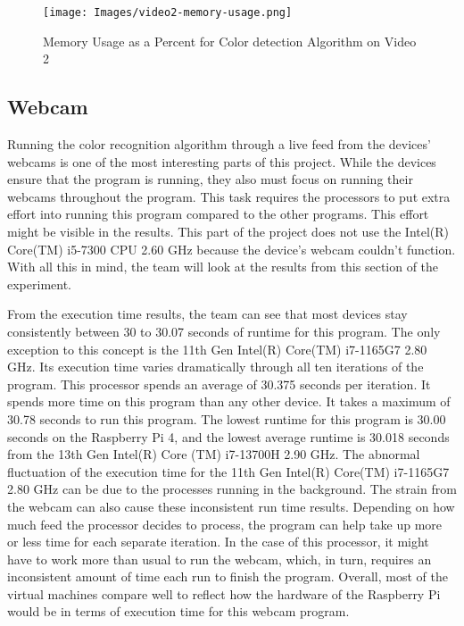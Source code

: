 \begin{figure}
    \centering
    \texttt{[image: Images/video2-memory-usage.png]}
    \caption{Memory Usage as a Percent for Color detection Algorithm on Video 2}
\end{figure}

\subsection{Webcam}

Running the color recognition algorithm through a live feed from the devices’ webcams is one of the most interesting parts of this project. While the devices ensure that the program is running, they also must focus on running their webcams throughout the program. This task requires the processors to put extra effort into running this program compared to the other programs. This effort might be visible in the results. This part of the project does not use the Intel(R) Core(TM) i5-7300 CPU 2.60 GHz because the device's webcam couldn't function. With all this in mind, the team will look at the results from this section of the experiment.

From the execution time results, the team can see that most devices stay consistently between 30 to 30.07 seconds of runtime for this program. The only exception to this concept is the 11th Gen Intel(R) Core(TM) i7-1165G7 2.80 GHz. Its execution time varies dramatically through all ten iterations of the program. This processor spends an average of 30.375 seconds per iteration. It spends more time on this program than any other device. It takes a maximum of 30.78 seconds to run this program. The lowest runtime for this program is 30.00 seconds on the Raspberry Pi 4, and the lowest average runtime is 30.018 seconds from the 13th Gen Intel(R) Core (TM) i7-13700H 2.90 GHz. The abnormal fluctuation of the execution time for the 11th Gen Intel(R) Core(TM) i7-1165G7 2.80 GHz can be due to the processes running in the background. The strain from the webcam can also cause these inconsistent run time results. Depending on how much feed the processor decides to process, the program can help take up more or less time for each separate iteration. In the case of this processor, it might have to work more than usual to run the webcam, which, in turn, requires an inconsistent amount of time each run to finish the program. Overall, most of the virtual machines compare well to reflect how the hardware of the Raspberry Pi would be in terms of execution time for this webcam program.

